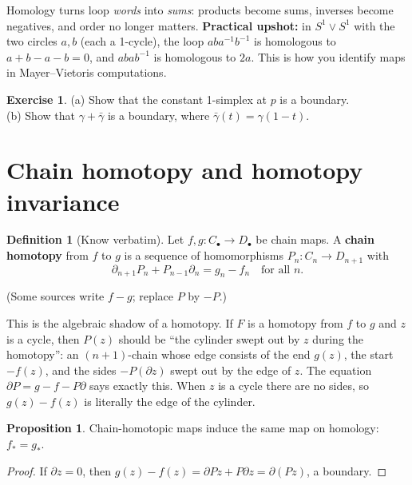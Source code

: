 \documentclass[11pt]{article}
\theoremstyle{definition}
\newtheorem{prop}[thm]{Proposition}
\newtheorem{defn}[thm]{Definition}
\newtheorem{exercise}{Exercise}[section]
\begin{document}
\begin{intuition}
Homology turns loop \emph{words} into \emph{sums}: products become sums, inverses become negatives, and order no longer matters. \textbf{Practical upshot:} in $S^1\vee S^1$ with the two circles $a,b$ (each a 1-cycle), the loop $aba^{-1}b^{-1}$ is homologous to $a+b-a-b=0$, and $abab^{-1}$ is homologous to $2a$. This is how you identify maps in Mayer--Vietoris computations.
\end{intuition}

\begin{exercise}\label{exr:loops}
(a) Show that the constant 1-simplex at $p$ is a boundary.\\
(b) Show that $\gamma+\bar\gamma$ is a boundary, where $\bar\gamma(t)=\gamma(1-t)$.
\end{exercise}

\section{Chain homotopy and homotopy invariance}

\begin{defn}[Know verbatim]
Let $f,g:C_\bullet\to D_\bullet$ be chain maps. A \textbf{chain homotopy} from $f$ to $g$ is a sequence of homomorphisms $P_n:C_n\to D_{n+1}$ with
\[\partial_{n+1}P_n+P_{n-1}\partial_n=g_n-f_n\quad\text{for all }n.\]
\end{defn}
(Some sources write $f-g$; replace $P$ by $-P$.)
\begin{intuition}
This is the algebraic shadow of a homotopy. If $F$ is a homotopy from $f$ to $g$ and $z$ is a cycle, then $P(z)$ should be ``the cylinder swept out by $z$ during the homotopy'': an $(n+1)$-chain whose edge consists of the end $g(z)$, the start $-f(z)$, and the sides $-P(\partial z)$ swept out by the edge of $z$. The equation $\partial P=g-f-P\partial$ says exactly this. When $z$ is a cycle there are no sides, so $g(z)-f(z)$ is literally the edge of the cylinder.
\end{intuition}

\begin{prop}
Chain-homotopic maps induce the same map on homology: $f_*=g_*$.
\end{prop}
\begin{proof}
If $\partial z=0$, then $g(z)-f(z)=\partial Pz+P\partial z=\partial(Pz)$, a boundary.
\end{proof}
\end{document}
